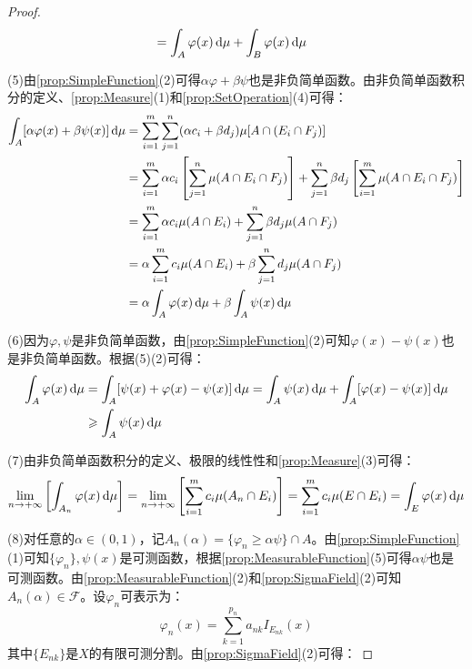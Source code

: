 \begin{proof}
\begin{align*}
		&=\int_{A}\varphi(x)\mathop{}\!\mathrm{d}\mu+\int_{B}\varphi(x)\mathop{}\!\mathrm{d}\mu
	\end{align*}\par
	(5)由\cref{prop:SimpleFunction}(2)可得$\alpha\varphi+\beta\psi$也是非负简单函数。由非负简单函数积分的定义、\cref{prop:Measure}(1)和\cref{prop:SetOperation}(4)可得：
	\begin{align*}
		\int_{A}[\alpha\varphi(x)+\beta\psi(x)]\mathop{}\!\mathrm{d}\mu
		&=\sum_{i=1}^{m}\sum_{j=1}^{n}(\alpha c_i+\beta d_j)\mu[A\cap (E_i\cap F_j)] \\
		&=\sum_{i=1}^{m}\alpha c_i\left[\sum_{j=1}^{n}\mu(A\cap E_i\cap F_j)\right]+\sum_{j=1}^{n}\beta d_j\left[\sum_{i=1}^{m}\mu(A\cap E_i\cap F_j)\right] \\
		&=\sum_{i=1}^{m}\alpha c_i\mu(A\cap E_i)+\sum_{j=1}^{n}\beta d_j\mu(A\cap F_j) \\ 
		&=\alpha\sum_{i=1}^{m}c_i\mu(A\cap E_i)+\beta\sum_{j=1}^{n}d_j\mu(A\cap F_j) \\
		&=\alpha\int_{A}\varphi(x)\mathop{}\!\mathrm{d}\mu+\beta\int_{A}\psi(x)\mathop{}\!\mathrm{d}\mu
	\end{align*}\par
	(6)因为$\varphi,\psi$是非负简单函数，由\cref{prop:SimpleFunction}(2)可知$\varphi(x)-\psi(x)$也是非负简单函数。根据(5)(2)可得：
	\begin{align*}
		\int_{A}^{}\varphi(x)\mathop{}\!\mathrm{d}\mu&=\int_{A}^{}[\psi(x)+\varphi(x)-\psi(x)]\mathop{}\!\mathrm{d}\mu=\int_{A}^{}\psi(x)\mathop{}\!\mathrm{d}\mu+\int_{A}^{}[\varphi(x)-\psi(x)]\mathop{}\!\mathrm{d}\mu \\
		&\geqslant\int_{A}^{}\psi(x)\mathop{}\!\mathrm{d}\mu
	\end{align*}\par
	(7)由非负简单函数积分的定义、极限的线性性和\cref{prop:Measure}(3)可得：
	\begin{equation*}
		\lim_{n\to+\infty}\left[\int_{A_n}\varphi(x)\mathop{}\!\mathrm{d}\mu\right]
		=\lim_{n\to+\infty}\left[\sum_{i=1}^{m}c_i\mu(A_n\cap E_i)\right]
		=\sum_{i=1}^{m}c_i\mu(E\cap E_i)
		=\int_{E}\varphi(x)\mathop{}\!\mathrm{d}\mu
	\end{equation*}\par
	(8)对任意的$\alpha\in(0,1)$，记$A_n(\alpha)=\{\varphi_n\geqslant\alpha\psi\}\cap  A$。由\cref{prop:SimpleFunction}(1)可知$\{\varphi_n\},\psi(x)$是可测函数，根据\cref{prop:MeasurableFunction}(5)可得$\alpha\psi$也是可测函数。由\cref{prop:MeasurableFunction}(2)和\cref{prop:SigmaField}(2)可知$A_n(\alpha)\in \mathscr{F}$。设$\varphi_n$可表示为：
	\begin{equation*}
		\varphi_n(x)=\sum_{k=1}^{p_n}a_{nk}I_{E_{nk}}(x)
	\end{equation*}
	其中$\{E_{nk}\}$是$X$的有限可测分割。由\cref{prop:SigmaField}(2)可得：

\end{proof}
